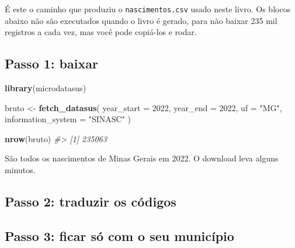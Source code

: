 \documentclass[
]{book}
\newenvironment{Shaded}{\begin{snugshade}}{\end{snugshade}}
\newcommand{\AttributeTok}[1]{\textcolor[rgb]{0.13,0.29,0.53}{#1}}
\newcommand{\CommentTok}[1]{\textcolor[rgb]{0.56,0.35,0.01}{\textit{#1}}}
\newcommand{\DecValTok}[1]{\textcolor[rgb]{0.00,0.00,0.81}{#1}}
\newcommand{\FunctionTok}[1]{\textcolor[rgb]{0.13,0.29,0.53}{\textbf{#1}}}
\newcommand{\NormalTok}[1]{#1}
\newcommand{\OtherTok}[1]{\textcolor[rgb]{0.56,0.35,0.01}{#1}}
\newcommand{\SpecialCharTok}[1]{\textcolor[rgb]{0.81,0.36,0.00}{\textbf{#1}}}
\newcommand{\StringTok}[1]{\textcolor[rgb]{0.31,0.60,0.02}{#1}}
\begin{document}
É este o caminho que produziu o \texttt{nascimentos.csv} usado neste livro. Os blocos abaixo não são executados quando o livro é gerado, para não baixar 235 mil registros a cada vez, mas você pode copiá-los e rodar.

\subsection{Passo 1: baixar}\label{passo-1-baixar}

\begin{Shaded}
\begin{Highlighting}[]
\FunctionTok{library}\NormalTok{(microdatasus)}

\NormalTok{bruto }\OtherTok{\textless{}{-}} \FunctionTok{fetch\_datasus}\NormalTok{(}
  \AttributeTok{year\_start =} \DecValTok{2022}\NormalTok{,}
  \AttributeTok{year\_end   =} \DecValTok{2022}\NormalTok{,}
  \AttributeTok{uf         =} \StringTok{"MG"}\NormalTok{,}
  \AttributeTok{information\_system =} \StringTok{"SINASC"}
\NormalTok{)}

\FunctionTok{nrow}\NormalTok{(bruto)}
\CommentTok{\#\textgreater{} [1] 235063}
\end{Highlighting}
\end{Shaded}

São todos os nascimentos de Minas Gerais em 2022. O download leva alguns minutos.

\subsection{Passo 2: traduzir os códigos}\label{passo-2-traduzir-os-cuxf3digos}

\begin{Shaded}
\end{Shaded}

\subsection{Passo 3: ficar só com o seu município}\label{passo-3-ficar-suxf3-com-o-seu-municuxedpio}
\end{document}
